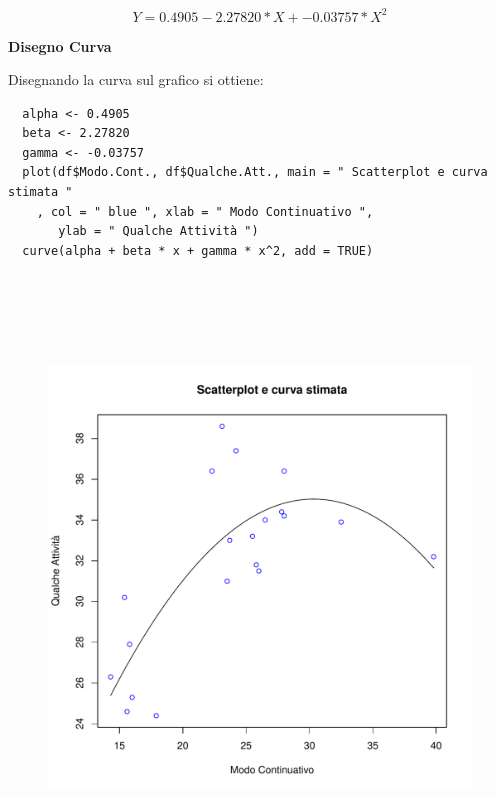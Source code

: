 \[Y = 0.4905 - 2.27820*X + -0.03757*X^2 \]

\noindent \textbf{Disegno Curva}

Disegnando la curva sul grafico si ottiene:

\vspace{5mm}
\begin{lstlisting}
  alpha <- 0.4905
  beta <- 2.27820
  gamma <- -0.03757
  plot(df$Modo.Cont., df$Qualche.Att., main = " Scatterplot e curva stimata "
    , col = " blue ", xlab = " Modo Continuativo ",
       ylab = " Qualche Attività ")
  curve(alpha + beta * x + gamma * x^2, add = TRUE)
\end{lstlisting}
\vspace{5mm}


\vspace{5mm}
\begin{figure}[!htbp]
    \centering
    \includegraphics[height=16cm]{ProgettoSAD/capitoli/images/s_desc_biv/scatterplot_nonlin_curva.pdf}
\end{figure}
\vspace{5mm}

